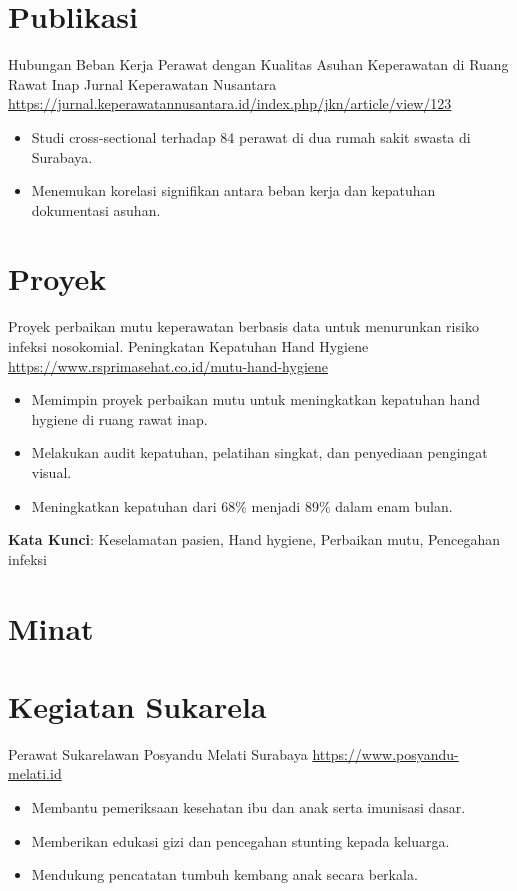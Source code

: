 \documentclass[a4paper, serif, 10pt]{moderncv}
\begin{document}
\section{Publikasi}

        {Hubungan Beban Kerja Perawat dengan Kualitas Asuhan Keperawatan di Ruang Rawat Inap}
        {Jurnal Keperawatan Nusantara}
        {\url{https://jurnal.keperawatannusantara.id/index.php/jkn/article/view/123}}
        {}
        {\begin{itemize}
\item Studi cross-sectional terhadap 84 perawat di dua rumah sakit swasta di Surabaya.
\item Menemukan korelasi signifikan antara beban kerja dan kepatuhan dokumentasi asuhan.
\end{itemize}}
\section{Proyek}

        {Proyek perbaikan mutu keperawatan berbasis data untuk menurunkan risiko infeksi nosokomial.}
        {Peningkatan Kepatuhan Hand Hygiene}
        {\url{https://www.rsprimasehat.co.id/mutu-hand-hygiene}}
        {}
        {\begin{itemize}
\item Memimpin proyek perbaikan mutu untuk meningkatkan kepatuhan hand hygiene di ruang rawat inap.
\item Melakukan audit kepatuhan, pelatihan singkat, dan penyediaan pengingat visual.
\item Meningkatkan kepatuhan dari 68\% menjadi 89\% dalam enam bulan.
\end{itemize}
\textbf{Kata Kunci}: Keselamatan pasien, Hand hygiene, Perbaikan mutu, Pencegahan infeksi}
\section{Minat}

\section{Kegiatan Sukarela}

        {Perawat Sukarelawan}
        {Posyandu Melati Surabaya}
        {\url{https://www.posyandu-melati.id}}
        {}
        {\begin{itemize}
\item Membantu pemeriksaan kesehatan ibu dan anak serta imunisasi dasar.
\item Memberikan edukasi gizi dan pencegahan stunting kepada keluarga.
\item Mendukung pencatatan tumbuh kembang anak secara berkala.
\end{itemize}}
    
\end{document}
